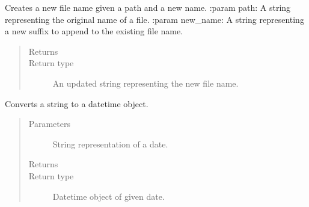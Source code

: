 \documentclass[letterpaper,10pt,english]{sphinxmanual}
\begin{document}

\begin{fulllineitems}
\label{\detokenize{index:ListManagement.utility.general.create_path_name}}
Creates a new file name given a path and a new name.
:param path: A string representing the original name of a file.
:param new\_name: A string representing a new suffix to append to the existing file name.
\begin{quote}\begin{description}
\item[{Returns}] \leavevmode


\item[{Return type}] \leavevmode
An updated string representing the new file name.

\end{description}\end{quote}

\end{fulllineitems}


\begin{fulllineitems}
\label{\detokenize{index:ListManagement.utility.general.date_parsing}}
Converts a string to a datetime object.
\begin{quote}\begin{description}
\item[{Parameters}] \leavevmode
{} \textendash{} String representation of a date.

\item[{Returns}] \leavevmode


\item[{Return type}] \leavevmode
Datetime object of given date.

\end{description}\end{quote}

\end{fulllineitems}

\end{document}
